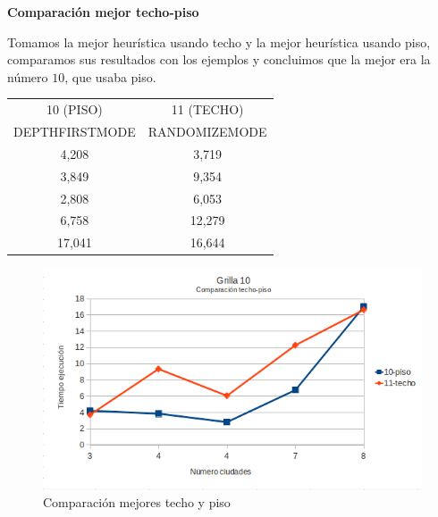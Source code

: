 \documentclass[10pt]{article}
\begin{document}
\newpage

\textbf{Comparación mejor techo-piso}

Tomamos la mejor heurística usando techo y la mejor heurística usando piso, comparamos sus resultados con los ejemplos y concluimos que la mejor era la número $10$, que usaba piso.\\
 
\begin{table}[ht]
\begin{minipage}[b]{1\linewidth}
 \centering
    \begin{tabular}{|c|c|}
        \hline
        10 (PISO)                        & 11 (TECHO)                 \\ 
        DEPTHFIRSTMODE                   & RANDOMIZEMODE            \\ \hline
        4,208                            & 3,719            \\ \hline
        3,849                            & 9,354            \\ \hline
        2,808                            & 6,053             \\ \hline
        6,758                            & 12,279             \\ \hline
        17,041                           & 16,644             \\
        \hline
    \end{tabular}
    \end{minipage}
\end{table}


\begin{figure}[ht]
\begin{minipage}[b]{1\linewidth}
 \centering
 \includegraphics[scale=0.4]{grilla10ceilfloor.png}
 \caption{Comparación mejores techo y piso}
 \label{fig:grid10ceilfloor}
 \end{minipage}
\end{figure}
\end{document}
